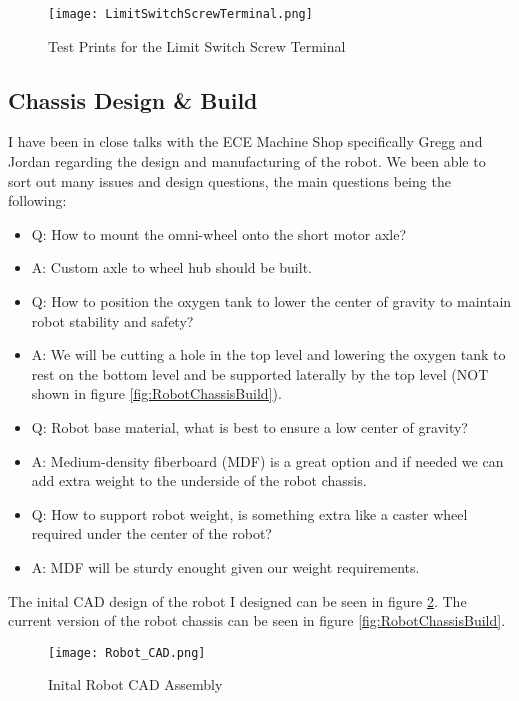 \documentclass{report}
\begin{document}
    \begin{figure}[ht!]
        \centering
        \texttt{[image: LimitSwitchScrewTerminal.png]}
        \caption{Test Prints for the Limit Switch Screw Terminal}
        \label{fig:LimitSwitchScrewTerminal}
    \end{figure}

    \subsection{Chassis Design \& Build}
    I have been in close talks with the ECE Machine Shop specifically Gregg and Jordan regarding the design and manufacturing of the robot. We been able to sort out many issues and design questions, the main questions being the following:

    \begin{itemize}
        \item Q: How to mount the omni-wheel onto the short motor axle?
        \item A: Custom axle to wheel hub should be built.
        \item Q: How to position the oxygen tank to lower the center of gravity to maintain robot stability and safety?
        \item A: We will be cutting a hole in the top level and lowering the oxygen tank to rest on the bottom level and be supported laterally by the top level (NOT shown in figure \ref{fig:RobotChassisBuild}).
        \item Q: Robot base material, what is best to ensure a low center of gravity?
        \item A: Medium-density fiberboard (MDF) is a great option and if needed we can add extra weight to the underside of the robot chassis.
        \item Q: How to support robot weight, is something extra like a caster wheel required under the center of the robot?
        \item A: MDF will be sturdy enought given our weight requirements.
    \end{itemize}

    The inital CAD design of the robot I designed can be seen in figure \ref{fig:Robot_CAD}. The current version of the robot chassis can be seen in figure \ref{fig:RobotChassisBuild}.

    \begin{figure}[ht!]
        \centering
        \texttt{[image: Robot\_CAD.png]}
        \caption{Inital Robot CAD Assembly}
        \label{fig:Robot_CAD}
    \end{figure}
\end{document}
